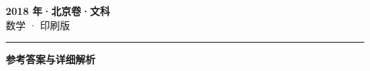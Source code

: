 \documentclass[zihao=5, a4paper]{ctexart}
\begin{document}
\begin{center}
  {\Large\bfseries 2018 年·北京卷·文科}\\[4pt]
  {\large 数学 · 印刷版}
\end{center}
\medskip
{}

\par\bigskip\hrule\bigskip
{}
\begin{center}{\large\bfseries 参考答案与详细解析}\end{center}
\smallskip

\end{document}
